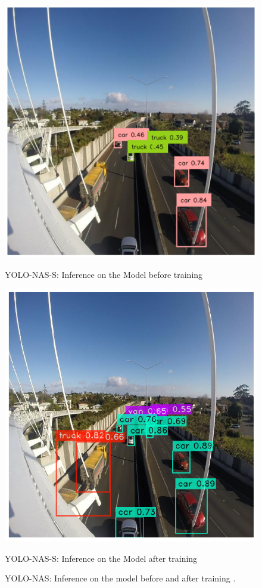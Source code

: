 \begin{figure}[H]
  \begin{minipage}{0.48\textwidth}
    \centering
    \includegraphics[width=\linewidth]{tex/img/S-before_trainingYN_S.png}
    \caption{YOLO-NAS-S: Inference 
    on the Model before training}
    \label{fig:YOLO-NASSM_vs_other_models}
  \end{minipage}%
  \begin{minipage}{0.5\textwidth}
    \centering
    \includegraphics[width=\linewidth]{tex/img/S-After training_YN_S.png}
    \caption{YOLO-NAS-S: Inference on the Model after training}
    \label{fig:YOLO-NAS_vs_other_models}
  \end{minipage}
  \caption{YOLO-NAS: Inference on the model before and  after training .}
\end{figure}

